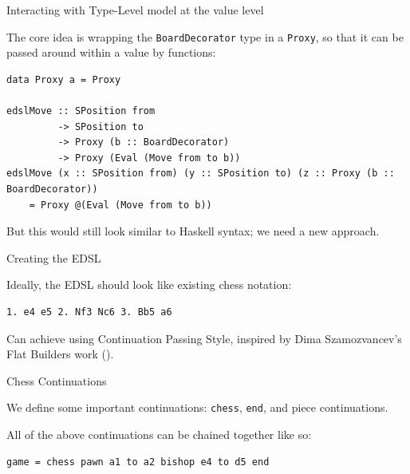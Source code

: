\documentclass{beamer}
\newcommand{\inline}[1]{\lstinline[basicstyle=\ttfamily]{#1}}
\begin{document}
\begin{frame}[fragile]{Interacting with Type-Level model at the value level}

The core idea is wrapping the \inline{BoardDecorator} type in a \inline{Proxy}, so that it can be passed around within a value by functions:

\begin{lstlisting}
data Proxy a = Proxy

edslMove :: SPosition from
         -> SPosition to
         -> Proxy (b :: BoardDecorator)
         -> Proxy (Eval (Move from to b))
edslMove (x :: SPosition from) (y :: SPosition to) (z :: Proxy (b :: BoardDecorator))
    = Proxy @(Eval (Move from to b))
\end{lstlisting}

But this would still look similar to Haskell syntax; we need a new approach.

\end{frame}

\begin{frame}[fragile]{Creating the EDSL}

Ideally, the EDSL should look like existing chess notation:

\begin{verbatim}
1. e4 e5 2. Nf3 Nc6 3. Bb5 a6
\end{verbatim}


Can achieve using Continuation Passing Style, inspired by Dima Szamozvancev's Flat Builders work (\cite{mezzo}).

\end{frame}

\begin{frame}[fragile]{Chess Continuations}

We define some important continuations: \pause \inline{chess}, \pause \inline{end}, \pause and piece continuations.


\pause

All of the above continuations can be chained together like so:

\begin{lstlisting}
game = chess pawn a1 to a2 bishop e4 to d5 end
\end{lstlisting}

\end{frame}
\end{document}

